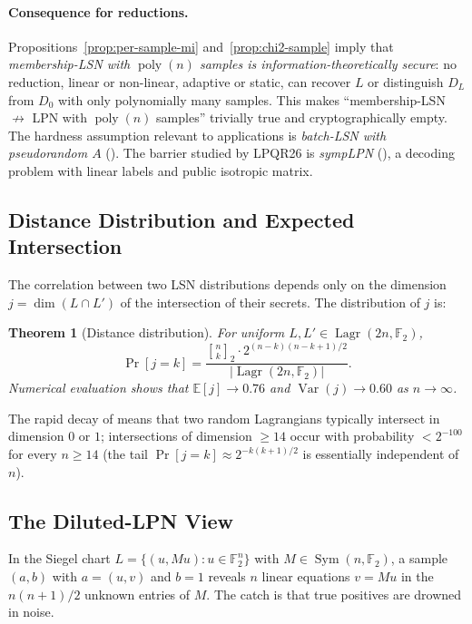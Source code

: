 \documentclass[11pt,a4paper]{article}
\theoremstyle{plain}
\newtheorem{theorem}{Theorem}[section]
\theoremstyle{definition}
\newcommand{\F}{\mathbb{F}}
\newcommand{\E}{\mathbb{E}}
\DeclareMathOperator{\Lagr}{Lagr}
\begin{document}
\paragraph{Consequence for reductions.} Propositions~\ref{prop:per-sample-mi} and~\ref{prop:chi2-sample} imply that \emph{membership-LSN with $\operatorname{poly}(n)$ samples is information-theoretically secure}: no reduction, linear or non-linear, adaptive or static, can recover $L$ or distinguish $D_L$ from $D_0$ with only polynomially many samples.  This makes ``membership-LSN $\not\to$ LPN with $\operatorname{poly}(n)$ samples'' trivially true and cryptographically empty.  The hardness assumption relevant to applications is \emph{batch-LSN with pseudorandom $A$} ().  The barrier studied by LPQR26 is \emph{sympLPN} (), a decoding problem with linear labels and public isotropic matrix.

\subsection{Distance Distribution and Expected Intersection}
\label{subsec:distance}

The correlation between two LSN distributions depends only on the dimension $j = \dim(L \cap L')$ of the intersection of their secrets. The distribution of $j$ is:

\begin{theorem}[Distance distribution]
\label{thm:distance}
For uniform $L, L' \in \Lagr(2n, \F_2)$,
\[
\Pr[j=k] = \frac{{n \brack k}_2 \cdot 2^{(n-k)(n-k+1)/2}}{|\Lagr(2n,\F_2)|}.
\]
Numerical evaluation shows that $\E[j] \to 0.76$ and $\operatorname{Var}(j) \to 0.60$ as $n \to \infty$.
\end{theorem}

The rapid decay of  means that two random Lagrangians typically intersect in dimension $0$ or $1$; intersections of dimension $\geq 14$ occur with probability $< 2^{-100}$ for every $n \geq 14$ (the tail $\Pr[j=k] \approx 2^{-k(k+1)/2}$ is essentially independent of $n$).

\subsection{The Diluted-LPN View}
\label{subsec:diluted-lpn}

In the Siegel chart $L = \{(u, Mu) : u \in \F_2^n\}$ with $M \in \operatorname{Sym}(n,\F_2)$, a sample $(a,b)$ with $a=(u,v)$ and $b=1$ reveals $n$ linear equations $v = Mu$ in the $n(n+1)/2$ unknown entries of $M$.  The catch is that true positives are drowned in noise.
\end{document}
